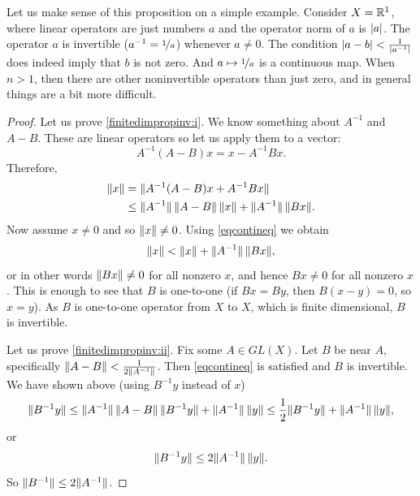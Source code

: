 Let us make sense of this proposition on a simple example.
Consider $X={\mathbb{R}}^1$, where linear operators are just
numbers $a$ and the operator norm of $a$ is $\lvert {a} \rvert$.
The operator $a$ is invertible ($a^{-1} = \nicefrac{1}{a}$)
whenever $a \not=0$.  The condition $\lvert {a-b} \rvert < \frac{1}{\lvert {a^{-1}} \rvert}$ does
indeed imply that $b$ is not zero.  And $a \mapsto \nicefrac{1}{a}$ is a continuous
map.
When $n > 1$, then there are other noninvertible operators than just zero,
and in general things are a bit more difficult.

\begin{proof}
Let us prove \ref{finitedimpropinv:i}.   We know something about $A^{-1}$
and $A-B$.  These are linear operators so let us
apply them to a vector:
\begin{equation*}
A^{-1}(A-B)x
=
x-A^{-1}Bx .
\end{equation*}
Therefore,
\begin{equation*}
\begin{split}
\lVert {x} \rVert 
& =
\lVert {A^{-1} (A-B)x + A^{-1}Bx} \rVert
\\
& \leq
\lVert {A^{-1}} \rVert\,\lVert {A-B} \rVert\, \lVert {x} \rVert + \lVert {A^{-1}} \rVert\,\lVert {Bx} \rVert .
\end{split}
\end{equation*}
Now assume $x \neq 0$ and so $\lVert {x} \rVert \neq 0$.
Using \eqref{eqcontineq} we obtain
\begin{equation*}
\lVert {x} \rVert < \lVert {x} \rVert + \lVert {A^{-1}} \rVert \, \lVert {Bx} \rVert ,
\end{equation*}
or in other words $\lVert {Bx} \rVert \not= 0$ for all nonzero $x$, and hence
$Bx \not= 0$ for all nonzero $x$.  This is enough to see that
$B$ is one-to-one (if $Bx = By$, then $B(x-y) = 0$, so $x=y$).
As $B$ is one-to-one operator from $X$ to $X$, which is finite dimensional,
$B$ is invertible.

Let us prove \ref{finitedimpropinv:ii}.  Fix some $A \in GL(X)$.  Let $B$ be near $A$,
specifically $\lVert {A-B} \rVert < \frac{1}{2 \lVert {A^{-1}} \rVert}$.
Then \eqref{eqcontineq} is satisfied and $B$ is invertible.
We have shown above (using $B^{-1}y$ instead of $x$)
\begin{equation*}
\lVert {B^{-1}y} \rVert \leq 
\lVert {A^{-1}} \rVert \, \lVert {A-B} \rVert \,  \lVert {B^{-1}y} \rVert + \lVert {A^{-1}} \rVert \, \lVert {y} \rVert
\leq
\frac{1}{2} \lVert {B^{-1}y} \rVert + \lVert {A^{-1}} \rVert\,\lVert {y} \rVert ,
\end{equation*}
or
\begin{equation*}
\lVert {B^{-1}y} \rVert \leq 
2\lVert {A^{-1}} \rVert\,\lVert {y} \rVert .
\end{equation*}
So
$
\lVert {B^{-1}} \rVert \leq 2 \lVert {A^{-1}} \rVert
$.


\end{proof}
